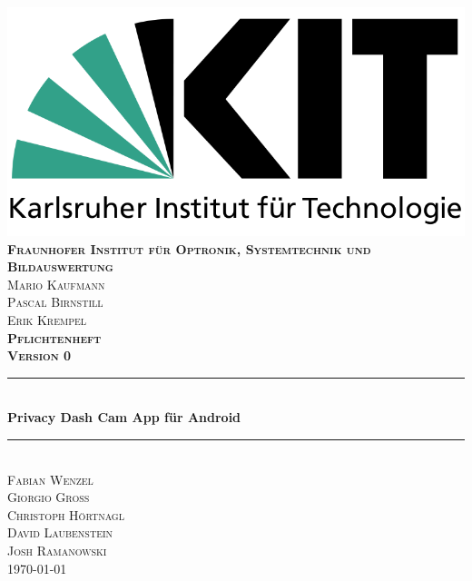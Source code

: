 \begin{titlepage}

\begin{center}

\includegraphics[width=0.5\linewidth]{subtopicsFuncspec/Res/KITLogo.png}\\[0.5cm]
  

\textsc{\bfseries Fraunhofer Institut für Optronik, Systemtechnik und Bildauswertung}\\[0.5cm]
\textsc{Mario Kaufmann\\Pascal Birnstill\\Erik Krempel}\\[2cm]

\textsc{\LARGE \bfseries Pflichtenheft}\\[0.5cm]
\textsc{\bfseries Version 0}\\[0.2cm]


\newcommand{\HRule}{\rule{\linewidth}{0.5mm}} 
{\color{mintgreen}\HRule} \\[0.4cm]
{\huge \bfseries Privacy Dash Cam App für Android}\\[0.4cm]
{\color{mintgreen}\HRule} \\[1cm]

\textsc{\Large Fabian Wenzel\\ Giorgio Groß\\ Christoph Hörtnagl\\ David Laubenstein\\[0.15cm]Josh Ramanowski} \\[2cm]

{\large \today}

\end{center}

\end{titlepage}